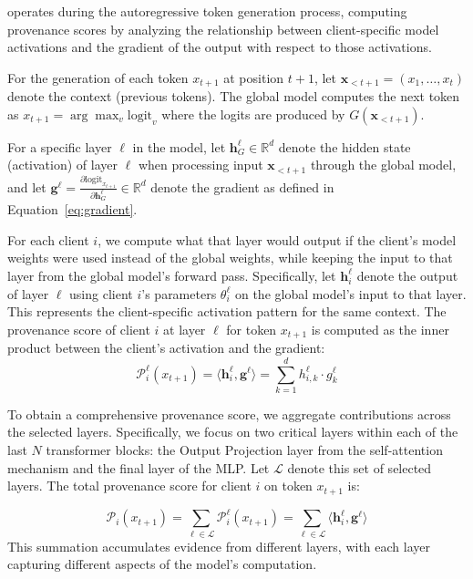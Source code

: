 \tool operates during the autoregressive token generation process, computing provenance scores by analyzing the relationship between client-specific model activations and the gradient of the output with respect to those activations.

For the generation of each token $x_{t+1}$ at position $t+1$, let $\mathbf{x}_{<t+1} = (x_1, \ldots, x_t)$ denote the context (previous tokens).
The global model computes the next token as $x_{t+1} = \arg\max_v \text{logit}_v$ where the logits are produced by $G(\mathbf{x}_{<t+1})$.

For a specific layer $\ell$ in the model, let $\mathbf{h}_G^\ell \in \mathbb{R}^d$ denote the hidden state (activation) of layer $\ell$ when processing input $\mathbf{x}_{<t+1}$ through the global model, and let $\mathbf{g}^\ell = \frac{\partial \text{logit}_{x_{t+1}}}{\partial \mathbf{h}_G^\ell} \in \mathbb{R}^d$ denote the gradient as defined in Equation~\ref{eq:gradient}.

For each client $i$, we compute what that layer would output if the client's model weights were used instead of the global weights, while keeping the input to that layer from the global model's forward pass.
Specifically, let $\mathbf{h}_i^\ell$ denote the output of layer $\ell$ using client $i$'s parameters $\theta_i^\ell$ on the global model's input to that layer. This represents the client-specific activation pattern for the same context.
The provenance score of client $i$ at layer $\ell$ for token $x_{t+1}$ is computed as the inner product between the client's activation and the gradient:
\begin{equation}
  \label{eq:layer-provenance}
  \mathcal{P}_i^{\ell}(x_{t+1}) = \langle \mathbf{h}_i^\ell, \mathbf{g}^\ell \rangle = \sum_{k=1}^d h_{i,k}^\ell \cdot g_k^\ell
\end{equation}

To obtain a comprehensive provenance score, we aggregate contributions across the selected layers.
Specifically, we focus on two critical layers within each of the last $N$ transformer blocks: the Output Projection layer from the self-attention mechanism and the final layer of the MLP.
Let $\mathcal{L}$ denote this set of selected layers. The total provenance score for client $i$ on token $x_{t+1}$ is:

\begin{equation}
  \label{eq:token-provenance}
  \mathcal{P}_i(x_{t+1}) = \sum_{\ell \in \mathcal{L}} \mathcal{P}_i^\ell(x_{t+1}) = \sum_{\ell \in \mathcal{L}} \langle \mathbf{h}_i^\ell, \mathbf{g}^\ell \rangle
\end{equation}
This summation accumulates evidence from different layers, with each layer capturing different aspects of the model's computation.

